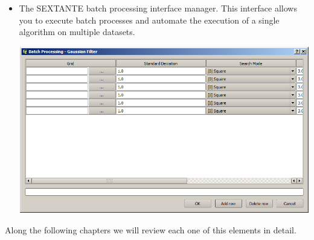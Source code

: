 \begin{itemize}
\begin{center}
			\end{center}	
\item The SEXTANTE batch processing interface manager. This interface allows you to execute batch processes and automate the execution of a single algorithm on multiple datasets.
			\begin{center}
			\includegraphics[width=.8\columnwidth]{batch_processing.png}
			\end{center}	
\end{itemize}			

Along the following chapters we will review each one of this elements in detail.